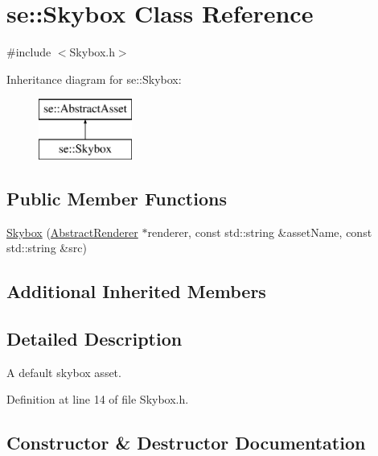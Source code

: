 \hypertarget{classse_1_1_skybox}{}\section{se\+:\+:Skybox Class Reference}
\label{classse_1_1_skybox}


{\ttfamily \#include $<$Skybox.\+h$>$}

Inheritance diagram for se\+:\+:Skybox\+:\begin{figure}[H]
\begin{center}
\leavevmode
\includegraphics[height=2.000000cm]{classse_1_1_skybox}
\end{center}
\end{figure}
\subsection*{Public Member Functions}
\begin{DoxyCompactItemize}
\item 
\mbox{\hyperlink{classse_1_1_skybox_adf8ae4ca19649dd144eeefca2c78b6df}{Skybox}} (\mbox{\hyperlink{classse_1_1_abstract_renderer}{Abstract\+Renderer}} $\ast$renderer, const std\+::string \&asset\+Name, const std\+::string \&src)
\end{DoxyCompactItemize}
\subsection*{Additional Inherited Members}


\subsection{Detailed Description}
A default skybox asset. 

Definition at line 14 of file Skybox.\+h.



\subsection{Constructor \& Destructor Documentation}
\mbox{\label{classse_1_1_skybox_adf8ae4ca19649dd144eeefca2c78b6df}} 
